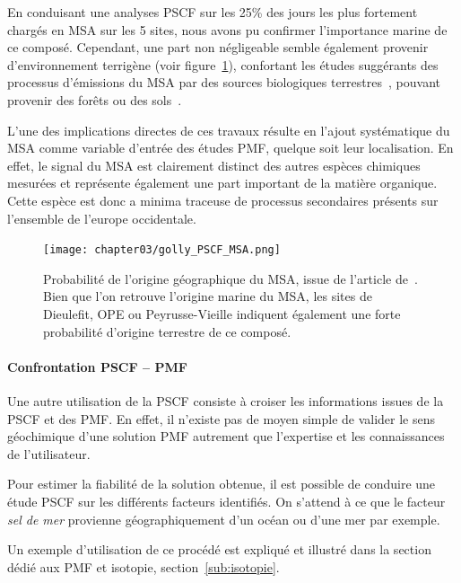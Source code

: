 En conduisant une analyses PSCF sur les 25\% des jours les plus fortement chargés en MSA
sur les 5 sites, nous avons pu confirmer l'importance marine de ce composé. 
Cependant, une part non négligeable semble également provenir d'environnement terrigène (voir
figure~\ref{fig:chapter03/golly_PSCF_MSA}), confortant les études suggérants des processus
d'émissions du MSA par des sources biologiques terrestres~\autocite{bozzettiArgon2017},
pouvant provenir des forêts ou des
sols~\autocite{jardineDimethyl2015,miyazakiSeasonal2012}.

L'une des implications directes de ces travaux résulte en l'ajout systématique du MSA
comme variable d'entrée des études PMF, quelque soit leur localisation. En effet, le
signal du MSA est clairement distinct des autres espèces chimiques mesurées et représente
également une part important de la matière organique. Cette espèce est donc a minima
traceuse de processus secondaires présents sur l'ensemble de l'europe occidentale.

\begin{figure}[ht!]
    \centering
    \texttt{[image: chapter03/golly\_PSCF\_MSA.png]}
    \caption{Probabilité de l'origine géographique du MSA, issue de l'article
        de~\textcite{gollyOrganic2019}. Bien que l'on retrouve l'origine marine du MSA,
        les sites de Dieulefit, OPE ou Peyrusse-Vieille indiquent également une forte
        probabilité d'origine terrestre de ce composé.}%
    \label{fig:chapter03/golly_PSCF_MSA}
\end{figure}

\paragraph{Confrontation PSCF -- PMF}%
\label{par:confrontation_pscf_pmf}

Une autre utilisation de la PSCF consiste à croiser les informations issues de la PSCF et
des PMF.
En effet, il n'existe pas de moyen simple de valider le sens géochimique d'une solution
PMF autrement que l'expertise et les connaissances de l'utilisateur.

Pour estimer la fiabilité de la solution obtenue, il est possible de conduire une
étude PSCF sur les différents facteurs identifiés. On s'attend à ce que le
facteur \textit{sel de mer} provienne géographiquement d'un océan ou d'une mer par
exemple.

Un exemple d'utilisation de ce procédé est expliqué et illustré dans la section dédié aux
PMF et isotopie, section~\ref{sub:isotopie}.




